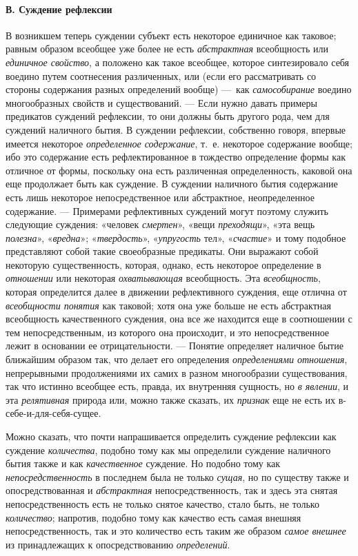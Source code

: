 \documentclass[twoside]{article}
\begin{document}
{{{\paragraph[В. Суждение рефлексии]{В. Суждение рефлексии}
В возникшем теперь суждении субъект есть некоторое единичное
как таковое; равным образом всеобщее уже более не есть
{\em абстрактная}
всеобщность или
{\em единичное свойство},
а положено как такое всеобщее, которое синтезировало себя
воедино путем соотнесения различенных, или (если его рассматривать со
стороны содержания разных определений вообще) —~как
{\em самособирание}
воедино многообразных свойств и существований. —
Если нужно давать примеры предикатов суждений рефлексии, то
они должны быть другого рода, чем для суждений наличного бытия. В суждении
рефлексии, собственно говоря, впервые имеется некоторое
{\em определенное содержание},
т.~е. некоторое содержание вообще; ибо это содержание есть
рефлектированное в тождество определение формы как отличное от формы,
поскольку она есть различенная определенность, каковой она еще продолжает
быть как суждение. В суждении наличного бытия содержание есть лишь
некоторое непосредственное или абстрактное, неопределенное содержание. —
Примерами рефлективных суждений могут поэтому служить
следующие суждения: «человек
{\em смертен}», «вещи
{\em преходящи}», «эта
вещь {\em полезна}»,
«{\em вредна}»;
«{\em твердость}»,
«{\em упругость} тел»,
«{\em счастие}» и тому
подобное представляют собой такие своеобразные предикаты. Они выражают
собой некоторую существенность, которая, однако, есть некоторое определение
в {\em отношении} или
некоторая {\em охватывающая}
всеобщность. Эта
{\em всеобщность},
которая определится далее в движении рефлективного суждения,
еще отлична от {\em всеобщности
понятия} как таковой; хотя она уже больше не есть
абстрактная всеобщность качественного суждения, она все же находится еще в
соотношении с тем непосредственным, из которого она происходит, и это
непосредственное лежит в основании ее отрицательности. —
Понятие определяет наличное бытие ближайшим образом так, что
делает его определения
{\em определениями отношения},
непрерывными продолжениями их самих в разном многообразии
существования, так что истинно всеобщее есть, правда, их внутренняя
сущность, но {\em в явлении},
и эта {\em релятивная}
природа или, можно также сказать, их
{\em признак} еще не есть
их в-себе-и-для-себя-сущее.

Можно сказать, что почти напрашивается определить суждение
рефлексии как суждение
{\em количества}, подобно
тому как мы определили суждение наличного бытия также и как
{\em качественное}
суждение. Но подобно тому как
{\em непосредственность}
в последнем была не только
{\em сущая}, но по
существу также и опосредствованная и
{\em абстрактная}
непосредственность, так и здесь эта снятая непосредственность
есть не только снятое качество, стало быть, не только
{\em количество};
напротив, подобно тому как качество есть самая внешняя
непосредственность, так и это количество есть таким же образом
{\em самое внешнее} из
принадлежащих к опосредствованию
{\em определений}.

}}}
\end{document}
